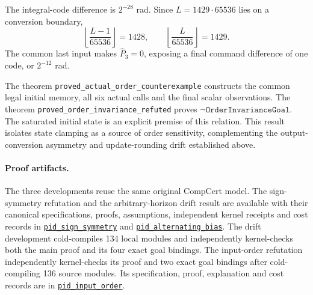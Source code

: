 \documentclass[manuscript, screen, review]{acmart}
\begin{document}
The integral-code difference is $2^{-28}$ rad.
Since $L=1429\cdot65536$ lies on a conversion boundary,
\begin{equation}
 \left\lfloor\frac{L-1}{65536}\right\rfloor=1428,\qquad
 \left\lfloor\frac{L}{65536}\right\rfloor=1429 .
 \label{eq:pid-order-output}
\end{equation}
The common last input makes $\widehat P_3=0$, exposing a final command
difference of one code, or $2^{-12}$ rad.
\begin{samepage}
The theorem
\texttt{proved\_\allowbreak actual\_\allowbreak order\_\allowbreak counterexample}
constructs the common legal initial memory, all six actual calls and
the final scalar observations.
The theorem
\texttt{proved\_\allowbreak order\_\allowbreak invariance\_\allowbreak refuted}
proves $\neg\texttt{OrderInvarianceGoal}$.
The saturated initial state is an explicit premise of this relation.
This result isolates state clamping as a source of order sensitivity,
complementing the output-conversion asymmetry and update-rounding drift
established above.
\par
\end{samepage}

\paragraph{Proof artifacts.}
The three developments reuse the same original CompCert model.
The sign-symmetry refutation and the arbitrary-horizon drift result are
available with their canonical specifications, proofs, assumptions,
independent kernel receipts and cost records in
\href{https://github.com/taylor-swift-13/FIVE/tree/f6a1f4d7ee419fc25042b769ef2cf8da741c2a96/paparazzi/relations/pid_sign_symmetry}{\texttt{pid\_\allowbreak sign\_\allowbreak symmetry}}
and
\href{https://github.com/taylor-swift-13/FIVE/tree/f6a1f4d7ee419fc25042b769ef2cf8da741c2a96/paparazzi/relations/pid_alternating_bias}{\texttt{pid\_\allowbreak alternating\_\allowbreak bias}}.
The drift development cold-compiles 134 local modules and independently
kernel-checks both the main proof and its four exact goal bindings.
The input-order refutation independently kernel-checks its proof and two
exact goal bindings after cold-compiling 136 source modules.
Its specification, proof, explanation and cost records are in
\href{https://github.com/taylor-swift-13/FIVE/tree/main/paparazzi/relations/pid_input_order}{\texttt{pid\_\allowbreak input\_\allowbreak order}}.
\end{document}

